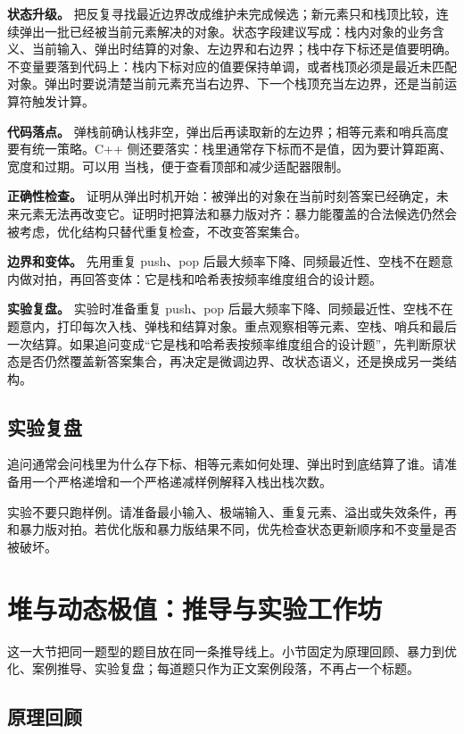 \textbf{状态升级。} 把反复寻找最近边界改成维护未完成候选；新元素只和栈顶比较，连续弹出一批已经被当前元素解决的对象。状态字段建议写成：栈内对象的业务含义、当前输入、弹出时结算的对象、左边界和右边界；栈中存下标还是值要明确。不变量要落到代码上：栈内下标对应的值要保持单调，或者栈顶必须是最近未匹配对象。弹出时要说清楚当前元素充当右边界、下一个栈顶充当左边界，还是当前运算符触发计算。

\textbf{代码落点。} 弹栈前确认栈非空，弹出后再读取新的左边界；相等元素和哨兵高度要有统一策略。C++ 侧还要落实：栈里通常存下标而不是值，因为要计算距离、宽度和过期。可以用  当栈，便于查看顶部和减少适配器限制。

\textbf{正确性检查。} 证明从弹出时机开始：被弹出的对象在当前时刻答案已经确定，未来元素无法再改变它。证明时把算法和暴力版对齐：暴力能覆盖的合法候选仍然会被考虑，优化结构只替代重复检查，不改变答案集合。

\textbf{边界和变体。} 先用重复 push、pop 后最大频率下降、同频最近性、空栈不在题意内做对拍，再回答变体：它是栈和哈希表按频率维度组合的设计题。

\textbf{实验复盘。} 实验时准备重复 push、pop 后最大频率下降、同频最近性、空栈不在题意内，打印每次入栈、弹栈和结算对象。重点观察相等元素、空栈、哨兵和最后一次结算。如果追问变成“它是栈和哈希表按频率维度组合的设计题”，先判断原状态是否仍然覆盖新答案集合，再决定是微调边界、改状态语义，还是换成另一类结构。

\subsection{实验复盘}

追问通常会问栈里为什么存下标、相等元素如何处理、弹出时到底结算了谁。请准备用一个严格递增和一个严格递减样例解释入栈出栈次数。

实验不要只跑样例。请准备最小输入、极端输入、重复元素、溢出或失效条件，再和暴力版对拍。若优化版和暴力版结果不同，优先检查状态更新顺序和不变量是否被破坏。

\section{堆与动态极值：推导与实验工作坊}
这一大节把同一题型的题目放在同一条推导线上。小节固定为原理回顾、暴力到优化、案例推导、实验复盘；每道题只作为正文案例段落，不再占一个标题。

\subsection{原理回顾}

